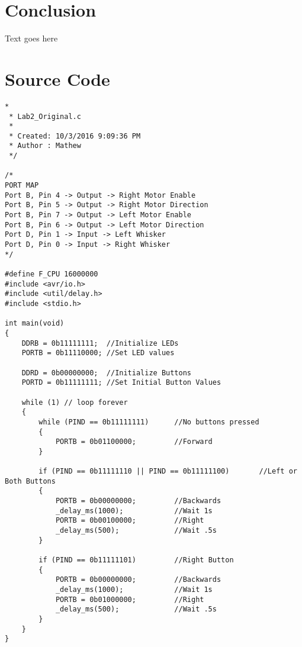 \documentclass[12pt,letterpaper]{article}
\begin{document}
\section{Conclusion}
Text goes here

\section{Source Code}
\begin{verbatim}
*
 * Lab2_Original.c
 *
 * Created: 10/3/2016 9:09:36 PM
 * Author : Mathew
 */ 

/*
PORT MAP
Port B, Pin 4 -> Output -> Right Motor Enable
Port B, Pin 5 -> Output -> Right Motor Direction
Port B, Pin 7 -> Output -> Left Motor Enable
Port B, Pin 6 -> Output -> Left Motor Direction
Port D, Pin 1 -> Input -> Left Whisker
Port D, Pin 0 -> Input -> Right Whisker
*/

#define F_CPU 16000000
#include <avr/io.h>
#include <util/delay.h>
#include <stdio.h>

int main(void)
{
	DDRB = 0b11111111;	//Initialize LEDs
	PORTB = 0b11110000; //Set LED values
	
	DDRD = 0b00000000;	//Initialize Buttons
	PORTD = 0b11111111;	//Set Initial Button Values

	while (1) // loop forever
	{
		while (PIND == 0b11111111)		//No buttons pressed
		{
			PORTB = 0b01100000;			//Forward
		}
		
		if (PIND == 0b11111110 || PIND == 0b11111100)		//Left or Both Buttons
		{
			PORTB = 0b00000000;			//Backwards
			_delay_ms(1000);			//Wait 1s
			PORTB = 0b00100000;			//Right
			_delay_ms(500);				//Wait .5s
		}

		if (PIND == 0b11111101)			//Right Button
		{
			PORTB = 0b00000000;			//Backwards
			_delay_ms(1000);			//Wait 1s
			PORTB = 0b01000000;			//Right
			_delay_ms(500);				//Wait .5s
		}
	}
}
\end{verbatim}
\end{document}
